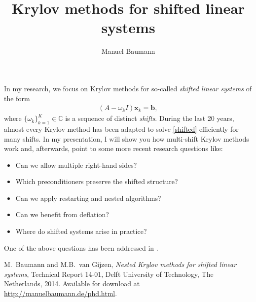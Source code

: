 \documentclass{article}
\title{Krylov methods for shifted linear systems}
\author{Manuel Baumann}
\affil{PhD student at TU Delft}
\date{}
\begin{document}
\maketitle
\setcounter{page}{5}
In my research, we focus on Krylov methods for so-called \textit{shifted linear systems} of the form
\begin{align}
\label{shifted}
 (A - \omega_k I) \mathbf{x}_k = \mathbf{b},
\end{align}
where $\{\omega_k\}_{k=1}^K \in \mathbb{C}$ is a sequence of distinct \textit{shifts}. During the last 20 years, almost every Krylov method has been adapted to solve \eqref{shifted} efficiently for many shifts. In my presentation, I will show you how multi-shift Krylov methods work and, afterwards, point to some more recent research questions like:
\begin{itemize}
 \item Can we allow multiple right-hand sides?
 \item Which preconditioners preserve the shifted structure?
 \item Can we apply restarting and nested algorithms?
 \item Can we benefit from deflation?
 \item Where do shifted systems arise in practice?
\end{itemize}

\noindent One of the above questions has been addressed in \cite{BG14}.

\begin{thebibliography}{10}
{\sc M.~Baumann and M.B.~van Gijzen}, {\em {N}ested {K}rylov methods for shifted linear systems}, Technical Report 14-01, Delft University of Technology, The Netherlands, 2014.
\newblock Available for download at \href{http://manuelbaumann.de/phd.html}{http://manuelbaumann.de/phd.html}.
\end{thebibliography}
\end{document}
